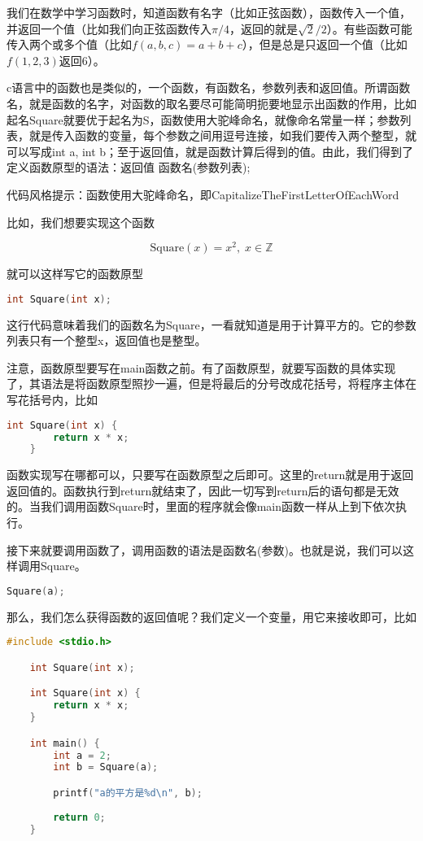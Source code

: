 我们在数学中学习函数时，知道函数有名字（比如正弦函数），函数传入一个值，并返回一个值（比如我们向正弦函数传入$\pi/4$，返回的就是$\sqrt{2}/2$）。有些函数可能传入两个或多个值（比如$f(a, b, c) = a + b + c$），但是总是只返回一个值（比如$f(1, 2, 3)$返回6）。

c语言中的函数也是类似的，一个函数，有函数名，参数列表和返回值。所谓函数名，就是函数的名字，对函数的取名要尽可能简明扼要地显示出函数的作用，比如起名Square就要优于起名为S，函数使用大驼峰命名，就像命名常量一样；参数列表，就是传入函数的变量，每个参数之间用逗号连接，如我们要传入两个整型，就可以写成int a, int b；至于返回值，就是函数计算后得到的值。由此，我们得到了定义函数原型的语法：返回值 函数名(参数列表);

代码风格提示：函数使用大驼峰命名，即CapitalizeTheFirstLetterOfEachWord

比如，我们想要实现这个函数

\[ \text{Square}(x) = x^2, \; x \in \mathbb{Z} \]

就可以这样写它的函数原型

\begin{lstlisting}[language=C]
    int Square(int x);
\end{lstlisting}

这行代码意味着我们的函数名为Square，一看就知道是用于计算平方的。它的参数列表只有一个整型x，返回值也是整型。

注意，函数原型要写在main函数之前。有了函数原型，就要写函数的具体实现了，其语法是将函数原型照抄一遍，但是将最后的分号改成花括号，将程序主体在写花括号内，比如

\begin{lstlisting}[language=C]
    int Square(int x) {
        return x * x;
    }
\end{lstlisting}

函数实现写在哪都可以，只要写在函数原型之后即可。这里的return就是用于返回返回值的。函数执行到return就结束了，因此一切写到return后的语句都是无效的。当我们调用函数Square时，里面的程序就会像main函数一样从上到下依次执行。

接下来就要调用函数了，调用函数的语法是函数名(参数)。也就是说，我们可以这样调用Square。

\begin{lstlisting}[language=C]
    Square(a);
\end{lstlisting}

那么，我们怎么获得函数的返回值呢？我们定义一个变量，用它来接收即可，比如

\begin{lstlisting}[language=C]
    #include <stdio.h>

    int Square(int x);

    int Square(int x) {
        return x * x;
    }

    int main() {
        int a = 2;
        int b = Square(a);

        printf("a的平方是%d\n", b);
        
        return 0;
    }
\end{lstlisting}

